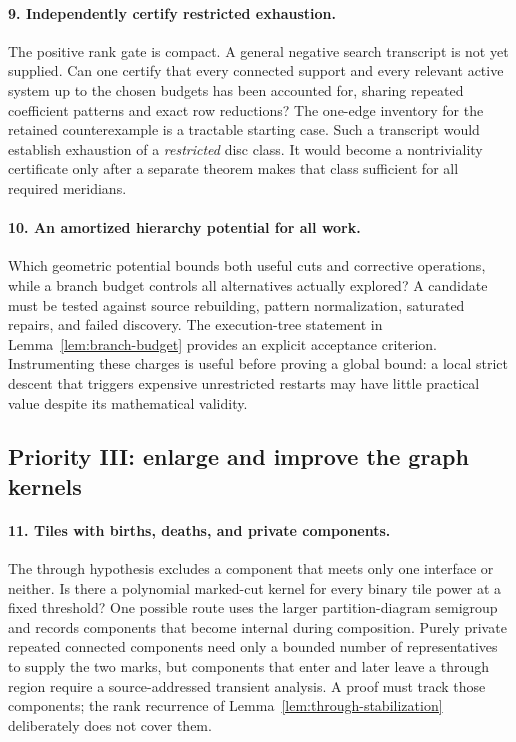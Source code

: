 \paragraph{9. Independently certify restricted exhaustion.}
The positive rank gate is compact. A general negative search transcript is
not yet supplied. Can one certify that every connected support and every
relevant active system up to the chosen budgets has been accounted for,
sharing repeated coefficient patterns and exact row reductions? The one-edge
inventory for the retained counterexample is a tractable starting case.
Such a transcript would establish exhaustion of a \emph{restricted} disc
class. It would become a nontriviality certificate only after a separate
theorem makes that class sufficient for all required meridians.

\paragraph{10. An amortized hierarchy potential for all work.}
Which geometric potential bounds both useful cuts and corrective operations,
while a branch budget controls all alternatives actually explored? A candidate
must be tested against source rebuilding, pattern normalization, saturated
repairs, and failed discovery. The execution-tree statement in
Lemma~\ref{lem:branch-budget} provides an explicit acceptance criterion.
Instrumenting these charges is useful before proving a global bound: a local
strict descent that triggers expensive unrestricted restarts may have little
practical value despite its mathematical validity.

\subsection{Priority III: enlarge and improve the graph kernels}

\paragraph{11. Tiles with births, deaths, and private components.}
The through hypothesis excludes a component that meets only one interface or
neither. Is there a polynomial marked-cut kernel for every binary tile power
at a fixed threshold? One possible route uses the larger partition-diagram
semigroup and records components that become internal during composition.
Purely private repeated connected components need only a bounded number of
representatives to supply the two marks, but components that enter and later
leave a through region require a source-addressed transient analysis. A proof
must track those components; the rank recurrence of
Lemma~\ref{lem:through-stabilization} deliberately does not cover them.

